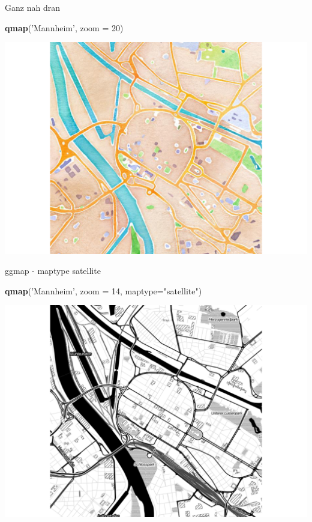 \documentclass[ignorenonframetext,]{beamer}
\newenvironment{Shaded}{}{}
\newcommand{\KeywordTok}[1]{\textcolor[rgb]{0.00,0.44,0.13}{\textbf{{#1}}}}
\newcommand{\DataTypeTok}[1]{\textcolor[rgb]{0.56,0.13,0.00}{{#1}}}
\newcommand{\DecValTok}[1]{\textcolor[rgb]{0.25,0.63,0.44}{{#1}}}
\newcommand{\StringTok}[1]{\textcolor[rgb]{0.25,0.44,0.63}{{#1}}}
\newcommand{\NormalTok}[1]{{#1}}
\begin{document}
\begin{frame}[fragile]{Ganz nah dran}

\begin{Shaded}
\begin{Highlighting}[]
\KeywordTok{qmap}\NormalTok{(}\StringTok{'Mannheim'}\NormalTok{, }\DataTypeTok{zoom =} \DecValTok{20}\NormalTok{)}
\end{Highlighting}
\end{Shaded}

\includegraphics{R_intern_files/figure-beamer/unnamed-chunk-266-1.pdf}

\end{frame}

\begin{frame}[fragile]{ggmap - maptype satellite}

\begin{Shaded}
\begin{Highlighting}[]
\KeywordTok{qmap}\NormalTok{(}\StringTok{'Mannheim'}\NormalTok{, }\DataTypeTok{zoom =} \DecValTok{14}\NormalTok{, }\DataTypeTok{maptype=}\StringTok{"satellite"}\NormalTok{)}
\end{Highlighting}
\end{Shaded}

\includegraphics{R_intern_files/figure-beamer/unnamed-chunk-267-1.pdf}

\end{frame}
\end{document}
